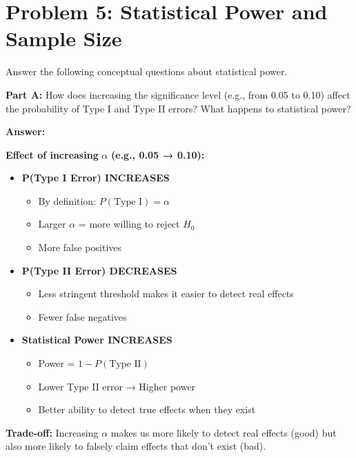 \documentclass[11pt]{article}
\begin{document}
\newpage

\section{Problem 5: Statistical Power and Sample Size}

Answer the following conceptual questions about statistical power.

\vspace{6pt}

\textbf{Part A:} How does increasing the significance level (e.g., from 0.05 to 0.10) affect the probability of Type I and Type II errors? What happens to statistical power?

\textcolor{answergreen}{\textbf{Answer:}}

\textbf{Effect of increasing} $\alpha$ \textbf{(e.g., 0.05 → 0.10):}

\begin{itemize}
\item \textbf{P(Type I Error) INCREASES}
  \begin{itemize}
  \item By definition: $P(\text{Type I}) = \alpha$
  \item Larger $\alpha$ = more willing to reject $H_0$
  \item More false positives
  \end{itemize}

\item \textbf{P(Type II Error) DECREASES}
  \begin{itemize}
  \item Less stringent threshold makes it easier to detect real effects
  \item Fewer false negatives
  \end{itemize}

\item \textbf{Statistical Power INCREASES}
  \begin{itemize}
  \item Power = $1 - P(\text{Type II})$
  \item Lower Type II error → Higher power
  \item Better ability to detect true effects when they exist
  \end{itemize}
\end{itemize}

\textbf{Trade-off:} Increasing $\alpha$ makes us more likely to detect real effects (good) but also more likely to falsely claim effects that don't exist (bad).
\end{document}
